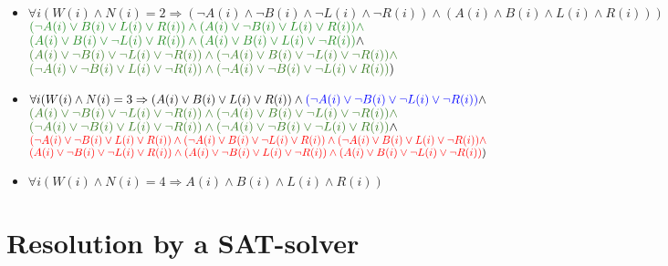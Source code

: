 \documentclass[a4paper]{article}
\begin{document}
\begin{itemize}
\begin{itemize}
\item $ \forall i ( W(i) \land N(i)=2 \Rightarrow (\neg A(i) \land \neg B(i) \land \neg L(i) \land \neg R(i)) \land ( A(i) \land B(i) \land L(i) \land R(i) ) )$  \\
$\textcolor{ForestGreen}{( \neg A(i) \lor B(i) \lor L(i) \lor R(i) ) \land  ( A(i) \lor \neg B(i) \lor L(i) \lor R(i) ) \land }$ \\
$ \textcolor{ForestGreen}{( A(i) \lor B(i) \lor \neg L(i) \lor R(i) ) \land ( A(i) \lor B(i) \lor L(i) \lor \neg R(i) )} \land $ \\
$\textcolor{OliveGreen}{( A(i) \lor \neg B(i) \lor \neg L(i) \lor \neg R(i) ) \land  ( \neg A(i) \lor B(i) \lor \neg L(i) \lor \neg R(i) ) \land }$ \\
$ \textcolor{OliveGreen}{( \neg A(i) \lor \neg B(i) \lor L(i) \lor \neg R(i) ) \land ( \neg A(i) \lor \neg B(i) \lor \neg L(i) \lor R(i) )} ) $ \\


\item $ \forall i ( W(i) \land N(i)=3 \Rightarrow  ( A(i) \lor B(i) \lor L(i) \lor R(i) ) \land \textcolor{blue}{( \neg A(i) \lor \neg B(i) \lor \neg L(i) \lor \neg R(i))}  \land $ \\
$\textcolor{OliveGreen}{( A(i) \lor \neg B(i) \lor \neg L(i) \lor \neg R(i) ) \land  ( \neg A(i) \lor B(i) \lor \neg L(i) \lor \neg R(i) ) \land }$ \\
$ \textcolor{OliveGreen}{( \neg A(i) \lor \neg B(i) \lor L(i) \lor \neg R(i) ) \land ( \neg A(i) \lor \neg B(i) \lor \neg L(i) \lor R(i) )} \land $ \\
$\textcolor{red}{( \neg A(i) \lor \neg B(i) \lor L(i) \lor R(i)) \land ( \neg A(i) \lor B(i) \lor \neg L(i) \lor R(i) ) \land ( \neg A(i) \lor B(i) \lor L(i) \lor \neg R(i) )\land } $ \\ 
$ \textcolor{red}{ ( A(i) \lor \neg B(i) \lor \neg L(i) \lor R(i) ) \land ( A(i) \lor \neg B(i) \lor L(i) \lor \neg R(i) ) \land ( A(i) \lor B(i) \lor \neg L(i) \lor \neg R(i) )} ) $  \\


\item $ \forall i ( W(i) \land N(i)=4 \Rightarrow A(i) \land B(i) \land L(i) \land R(i) )$  
\end{itemize}
\end{itemize}
\section{Resolution by a SAT-solver}
\end{document}
